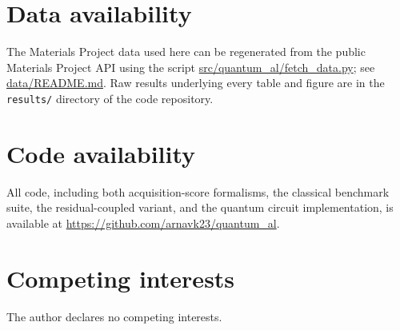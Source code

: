 \documentclass[10pt]{article}
\begin{document}
\section*{Data availability}
The Materials Project data used here can be regenerated from the public Materials Project API using the script \url{src/quantum_al/fetch_data.py}; see \url{data/README.md}. Raw results underlying every table and figure are in the \texttt{results/} directory of the code repository.

\section*{Code availability}
All code, including both acquisition-score formalisms, the classical benchmark suite, the residual-coupled variant, and the quantum circuit implementation, is available at \url{https://github.com/arnavk23/quantum_al}.

\section*{Competing interests}
The author declares no competing interests.



\end{document}
